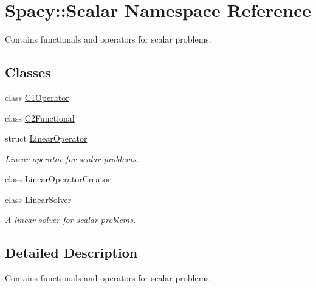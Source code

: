 \hypertarget{namespaceSpacy_1_1Scalar}{}\section{Spacy\+:\+:Scalar Namespace Reference}
\label{namespaceSpacy_1_1Scalar}


Contains functionals and operators for scalar problems.  


\subsection*{Classes}
\begin{DoxyCompactItemize}
\item 
class \hyperlink{classSpacy_1_1Scalar_1_1C1Operator}{C1\+Operator}
\item 
class \hyperlink{classSpacy_1_1Scalar_1_1C2Functional}{C2\+Functional}
\item 
struct \hyperlink{structSpacy_1_1Scalar_1_1LinearOperator}{Linear\+Operator}
\begin{DoxyCompactList}\small\item\em Linear operator for scalar problems. \end{DoxyCompactList}\item 
class \hyperlink{classSpacy_1_1Scalar_1_1LinearOperatorCreator}{Linear\+Operator\+Creator}
\item 
class \hyperlink{classSpacy_1_1Scalar_1_1LinearSolver}{Linear\+Solver}
\begin{DoxyCompactList}\small\item\em A linear solver for scalar problems. \end{DoxyCompactList}\end{DoxyCompactItemize}


\subsection{Detailed Description}
Contains functionals and operators for scalar problems. 